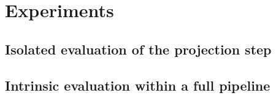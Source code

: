 \chapter{Experiments}
\label{sec:experiments}

\section{Isolated evaluation of the projection step}

\section{Intrinsic evaluation within a full pipeline}
